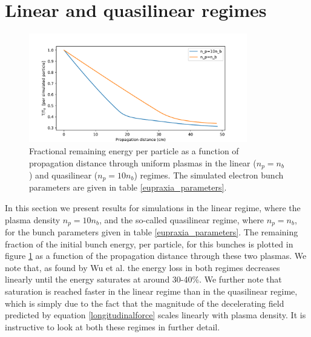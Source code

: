 \section{Linear and quasilinear regimes}
\begin{figure}
\centering
\includegraphics[width=0.85\textwidth]{Energy30pc_per_particle_lowres2.pdf}
\caption{\small{Fractional remaining energy per particle as a function of propagation distance through uniform plasmas in the linear ($n_p=n_b$) and quasilinear ($n_p=10n_b$) regimes. The simulated electron bunch parameters are given in table \ref{eupraxia_parameters}.}}
\label{energyloss}
\end{figure}
In this section we present results for simulations in the linear regime, where the plasma density $n_p=10n_b$, and the so-called quasilinear regime, where $n_p=n_b$, for the bunch parameters given  in table \ref{eupraxia_parameters}. The remaining fraction of the initial bunch energy, per particle, for this bunches is plotted in figure \ref{energyloss} as a function of the propagation distance through these two plasmas. We note that, as found by Wu et al. \cite{Wu2010} the energy loss in both regimes decreases linearly until the energy saturates at around 30-40\%. We further note that saturation is reached faster in the linear regime than in the quasilinear regime, which is simply due to the fact that the magnitude of the decelerating field predicted by equation \ref{longitudinalforce} scales linearly with plasma density. It is instructive to look at both these regimes in further detail.\\

